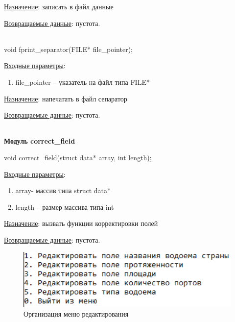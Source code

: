 \underline{Назначение}: записать в файл данные 

\underline{Возвращаемые данные}: пустота.

\hspace{0pt}\\



void fprint\_separator(FILE* file\_pointer);

\underline{Входные параметры}: 

\begin{enumerate}
    \item file\_pointer – указатель на файл типа FILE*
\end{enumerate}

\underline{Назначение}: напечатать в файл сепаратор

\underline{Возвращаемые данные}: пустота.

\hspace{0pt}\\



\textbf{Модуль correct\_field}

void correct\_field(struct data* array, int length);

\underline{Входные параметры}: 

\begin{enumerate}
    \item array- массив типа struct data*
    \item length – размер массива типа int
\end{enumerate}

\underline{Назначение}: вызвать функции корректировки полей 

\underline{Возвращаемые данные}: пустота.

\begin{figure}[!hp]
    \begin{center}
        \includegraphics[width=14cm]{../includes_PZ/programmDevelopment/correctFieldMenu.png}
    \end{center}
    \caption{Организация меню редактирования\label{fig:menu}}
\end{figure}

